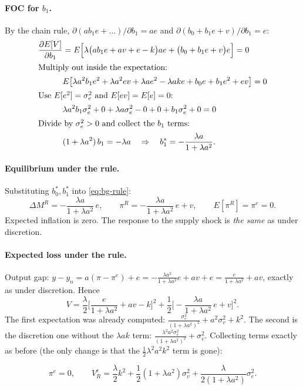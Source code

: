 \paragraph{FOC for $b_1$.} By the chain rule, $\partial(ab_1e+\dots)/\partial b_1=ae$ and $\partial(b_0+b_1e+v)/\partial b_1=e$:
\begin{align*}
\frac{\partial E[V]}{\partial b_1}&=E\Big[\lambda\big(ab_1e+av+e-k\big)ae+\big(b_0+b_1e+v\big)e\Big]=0\\
\intertext{Multiply out inside the expectation:}
&E\big[\lambda a^2b_1e^2+\lambda a^2ev+\lambda ae^2-\lambda ake+b_0e+b_1e^2+ev\big]=0\\
\intertext{Use $E[e^2]=\sigma_e^2$ and $E[ev]=E[e]=0$:}
&\lambda a^2b_1\sigma_e^2+0+\lambda a\sigma_e^2-0+0+b_1\sigma_e^2+0=0\\
\intertext{Divide by $\sigma_e^2>0$ and collect the $b_1$ terms:}
&(1+\lambda a^2)\,b_1=-\lambda a
\quad\Rightarrow\quad b_1^*=-\frac{\lambda a}{1+\lambda a^2}.
\end{align*}

\paragraph{Equilibrium under the rule.} Substituting $b_0^*,b_1^*$ into \eqref{eq:bg-rule}:
\begin{equation}
\Delta M^R=-\frac{\lambda a}{1+\lambda a^2}\,e,\qquad
\pi^R=-\frac{\lambda a}{1+\lambda a^2}\,e+v,\qquad
E[\pi^R]=\pi^e=0 .\label{eq:bg-piR}
\end{equation}
Expected inflation is zero. The response to the supply shock is \emph{the same} as under discretion.

\paragraph{Expected loss under the rule.} Output gap: $y-y_n=a(\pi-\pi^e)+e=-\frac{\lambda a^2}{1+\lambda a^2}e+av+e=\frac{e}{1+\lambda a^2}+av$, exactly as under discretion. Hence
\[
V=\frac{\lambda}{2}\Big[\frac{e}{1+\lambda a^2}+av-k\Big]^2+\frac12\Big[-\frac{\lambda a}{1+\lambda a^2}\,e+v\Big]^2 .
\]
The first expectation was already computed: $\frac{\sigma_e^2}{(1+\lambda a^2)^2}+a^2\sigma_v^2+k^2$. The second is the discretion one without the $\lambda ak$ term: $\frac{\lambda^2a^2\sigma_e^2}{(1+\lambda a^2)^2}+\sigma_v^2$. Collecting terms exactly as before (the only change is that the $\frac12\lambda^2a^2k^2$ term is gone):
\begin{keybox}[title=Equilibrium under the optimal rule]
\begin{equation}
\pi^e=0,\qquad
V_R^e=\frac{\lambda}{2}k^2+\frac12(1+\lambda a^2)\sigma_v^2+\frac{\lambda}{2(1+\lambda a^2)}\sigma_e^2 .\label{eq:bg-VR}
\end{equation}
\end{keybox}

